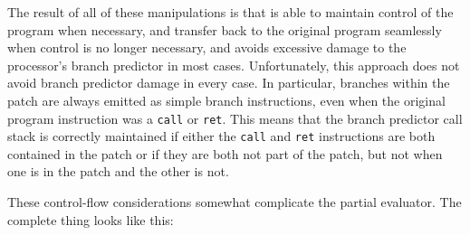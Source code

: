 The result of all of these manipulations is that {\technique} is able
to maintain control of the program when necessary, and transfer back
to the original program seamlessly when control is no longer
necessary, and avoids excessive damage to the processor's branch
predictor in most cases.  Unfortunately, this approach does not avoid
branch predictor damage in every case.  In particular, branches within
the patch are always emitted as simple branch instructions, even when
the original program instruction was a \verb|call| or \verb|ret|.
This means that the branch predictor call stack is correctly
maintained if either the \verb|call| and \verb|ret| instructions are
both contained in the patch or if they are both not part of the patch,
but not when one is in the patch and the other is not.  


These control-flow considerations somewhat complicate the partial
evaluator.  The complete thing looks like this:

